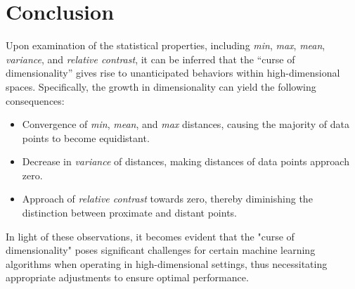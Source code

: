 \section{Conclusion}
Upon examination of the statistical properties, including \emph{min}, \emph{max},
\emph{mean}, \emph{variance}, and \emph{relative contrast}, it can be inferred
that the ``curse of dimensionality'' gives rise to unanticipated behaviors within
high-dimensional spaces. Specifically, the growth in dimensionality can yield
the following consequences:


\begin{itemize}
    \item Convergence of \emph{min}, \emph{mean}, and \emph{max} distances,
    causing the majority of data points to become equidistant.
    \item Decrease in \emph{variance} of distances, making distances of data
    points approach zero.
    \item Approach of \emph{relative contrast} towards zero, thereby
    diminishing the distinction between proximate and distant points.
\end{itemize}

In light of these observations, it becomes evident that the "curse of
dimensionality" poses significant challenges for certain machine learning
algorithms when operating in high-dimensional settings, thus necessitating 
appropriate adjustments to ensure optimal performance.